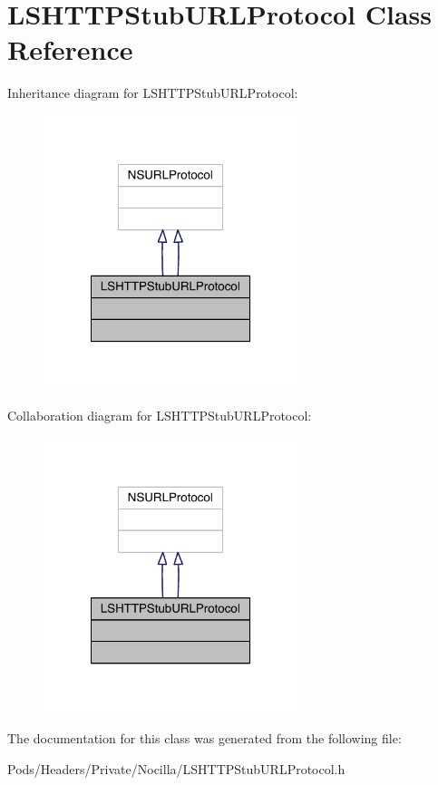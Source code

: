 \hypertarget{interface_l_s_h_t_t_p_stub_u_r_l_protocol}{\section{L\-S\-H\-T\-T\-P\-Stub\-U\-R\-L\-Protocol Class Reference}
\label{interface_l_s_h_t_t_p_stub_u_r_l_protocol}
}


Inheritance diagram for L\-S\-H\-T\-T\-P\-Stub\-U\-R\-L\-Protocol\-:\nopagebreak
\begin{figure}[H]
\begin{center}
\leavevmode
\includegraphics[width=210pt]{interface_l_s_h_t_t_p_stub_u_r_l_protocol__inherit__graph}
\end{center}
\end{figure}


Collaboration diagram for L\-S\-H\-T\-T\-P\-Stub\-U\-R\-L\-Protocol\-:\nopagebreak
\begin{figure}[H]
\begin{center}
\leavevmode
\includegraphics[width=210pt]{interface_l_s_h_t_t_p_stub_u_r_l_protocol__coll__graph}
\end{center}
\end{figure}


The documentation for this class was generated from the following file\-:\begin{DoxyCompactItemize}
\item 
Pods/\-Headers/\-Private/\-Nocilla/L\-S\-H\-T\-T\-P\-Stub\-U\-R\-L\-Protocol.\-h\end{DoxyCompactItemize}

